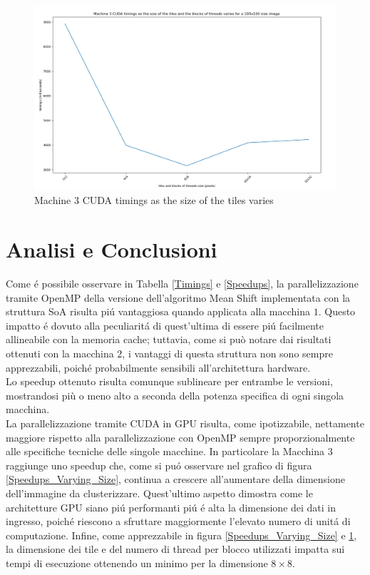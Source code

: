 \documentclass{article}
\begin{document}
\begin{center}
\begin{figure}[!h]
\centering
\includegraphics[width= 13cm]{"Immagini/Timings_Varying_Tiles.PNG"}
\caption{Machine $ 3 $ CUDA timings as the size of the tiles varies}
\label{Timings_Varying_Tile}
\end{figure}

\end{center}

\newpage

\section{Analisi e Conclusioni}

Come \'e possibile osservare in Tabella \ref{Timings} e \ref{Speedups}, la parallelizzazione tramite OpenMP della versione dell’algoritmo Mean Shift implementata con la struttura SoA risulta pi\'u vantaggiosa quando applicata alla macchina $ 1 $. Questo impatto \'e dovuto alla peculiarit\'a di quest’ultima di essere pi\'u facilmente allineabile con la memoria cache; tuttavia, come si può notare dai risultati ottenuti con la macchina $ 2 $, i vantaggi di questa struttura non sono sempre apprezzabili, poich\'e probabilmente sensibili all'architettura hardware.\\
Lo speedup ottenuto risulta comunque sublineare per entrambe le versioni, mostrandosi più o meno alto a seconda della potenza specifica di ogni singola macchina.\\
La parallelizzazione tramite CUDA in GPU risulta, come ipotizzabile, nettamente maggiore rispetto alla parallelizzazione con OpenMP sempre proporzionalmente alle specifiche tecniche delle singole macchine. In particolare la Macchina $ 3 $ raggiunge uno speedup che, come si pu\'o osservare nel grafico di figura \ref{Speedups_Varying_Size}, continua a crescere all'aumentare della dimensione dell'immagine da clusterizzare. Quest'ultimo aspetto dimostra come le architetture GPU siano pi\'u performanti pi\'u \'e alta la dimensione dei dati in ingresso, poich\'e riescono a sfruttare maggiormente l'elevato numero di unit\'a di computazione. Infine, come apprezzabile in figura \ref{Speedups_Varying_Size} e \ref{Timings_Varying_Tile}, la dimensione dei tile e del numero di thread per blocco utilizzati impatta sui tempi di esecuzione ottenendo un minimo per la dimensione $8\times8$.  
\end{document}
